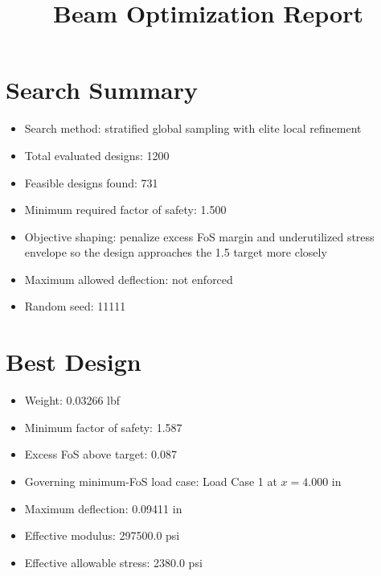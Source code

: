 \documentclass[11pt]{article}
\title{Beam Optimization Report}
\date{}
\begin{document}
\maketitle

\section*{Search Summary}
\begin{itemize}
\item Search method: stratified global sampling with elite local refinement
\item Total evaluated designs: 1200
\item Feasible designs found: 731
\item Minimum required factor of safety: 1.500
\item Objective shaping: penalize excess FoS margin and underutilized stress envelope so the design approaches the 1.5 target more closely
\item Maximum allowed deflection: not enforced
\item Random seed: 11111
\end{itemize}

\section*{Best Design}
\begin{itemize}
\item Weight: 0.03266 lbf
\item Minimum factor of safety: 1.587
\item Excess FoS above target: 0.087
\item Governing minimum-FoS load case: Load Case 1 at $x=4.000$ in
\item Maximum deflection: 0.09411 in
\item Effective modulus: 297500.0 psi
\item Effective allowable stress: 2380.0 psi
\end{itemize}
\end{document}
